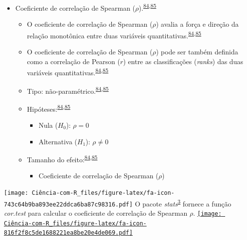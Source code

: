 \documentclass[
]{book}
\providecommand{\tightlist}{%
  \setlength{\itemsep}{0pt}\setlength{\parskip}{0pt}}
\begin{document}
\begin{itemize}
\item
  Coeficiente de correlação de Spearman (\(\rho\)).\textsuperscript{\protect\hyperlink{ref-khamis2008}{84},\protect\hyperlink{ref-allison2022}{85}}

  \begin{itemize}
  \item
    O coeficiente de correlação de Spearman (\(\rho\)) avalia a força e direção da relação monotônica entre duas variáveis quantitativas.\textsuperscript{\protect\hyperlink{ref-khamis2008}{84},\protect\hyperlink{ref-allison2022}{85}}
  \item
    O coeficiente de correlação de Spearman (\(\rho\)) pode ser também definida como a correlação de Pearson (\(r\)) entre as classificações (\emph{ranks}) das duas variáveis quantitativas.\textsuperscript{\protect\hyperlink{ref-khamis2008}{84},\protect\hyperlink{ref-allison2022}{85}}
  \item
    Tipo: não-paramétrico.\textsuperscript{\protect\hyperlink{ref-khamis2008}{84},\protect\hyperlink{ref-allison2022}{85}}
  \item
    Hipóteses:\textsuperscript{\protect\hyperlink{ref-khamis2008}{84},\protect\hyperlink{ref-allison2022}{85}}

    \begin{itemize}
    \item
      Nula (\(H_{0}\)): \(\rho=0\)
    \item
      Alternativa (\(H_{1}\)): \(\rho≠0\)
    \end{itemize}
  \item
    Tamanho do efeito:\textsuperscript{\protect\hyperlink{ref-khamis2008}{84},\protect\hyperlink{ref-allison2022}{85}}

    \begin{itemize}
    \tightlist
    \item
      Coeficiente de correlação de Spearman (\(\rho\))
    \end{itemize}
  \end{itemize}
\end{itemize}

\texttt{[image: Ciência-com-R\_files/figure-latex/fa-icon-743c64b9ba893ee22ddca6ba87c98316.pdf]} O pacote \emph{stats}\textsuperscript{\protect\hyperlink{ref-stats-2}{3}} fornece a função \emph{cor.test} para calcular o coeficiente de correlação de Spearman \(\rho\). \href{https://rdocumentation.org/packages/stats/versions/3.6.2}{\texttt{[image: Ciência-com-R\_files/figure-latex/fa-icon-816f2f8c5de1688221ea8be20e4de069.pdf]}}
\end{document}

